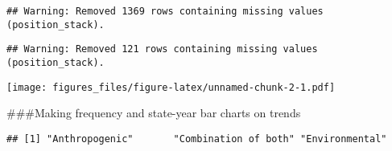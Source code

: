 \documentclass[
]{article}
\newenvironment{Shaded}{\begin{snugshade}}{\end{snugshade}}
\newcommand{\CommentTok}[1]{\textcolor[rgb]{0.56,0.35,0.01}{\textit{#1}}}
\newcommand{\KeywordTok}[1]{\textcolor[rgb]{0.13,0.29,0.53}{\textbf{#1}}}
\newcommand{\NormalTok}[1]{#1}
\newcommand{\OperatorTok}[1]{\textcolor[rgb]{0.81,0.36,0.00}{\textbf{#1}}}
\newcommand{\StringTok}[1]{\textcolor[rgb]{0.31,0.60,0.02}{#1}}
\begin{document}
\begin{verbatim}
## Warning: Removed 1369 rows containing missing values (position_stack).
\end{verbatim}

\begin{verbatim}
## Warning: Removed 121 rows containing missing values (position_stack).
\end{verbatim}

\texttt{[image: figures\_files/figure-latex/unnamed-chunk-2-1.pdf]}

\#\#\#Making frequency and state-year bar charts on trends

\begin{Shaded}
\end{Shaded}

\begin{verbatim}
## [1] "Anthropogenic"       "Combination of both" "Environmental"
\end{verbatim}
\end{document}
